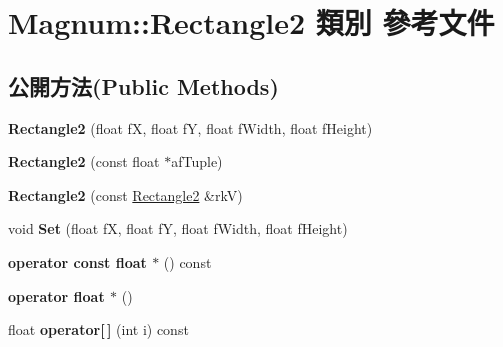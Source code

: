 \hypertarget{class_magnum_1_1_rectangle2}{}\section{Magnum\+:\+:Rectangle2 類別 參考文件}
\label{class_magnum_1_1_rectangle2}
\subsection*{公開方法(Public Methods)}
\begin{DoxyCompactItemize}
\item 
{\bfseries Rectangle2} (float fX, float fY, float f\+Width, float f\+Height)\hypertarget{class_magnum_1_1_rectangle2_a4564836390230478153dc94e8be9a3ab}{}\label{class_magnum_1_1_rectangle2_a4564836390230478153dc94e8be9a3ab}

\item 
{\bfseries Rectangle2} (const float $\ast$af\+Tuple)\hypertarget{class_magnum_1_1_rectangle2_a3f3d726bf41ba44d8831b33724f79499}{}\label{class_magnum_1_1_rectangle2_a3f3d726bf41ba44d8831b33724f79499}

\item 
{\bfseries Rectangle2} (const \hyperlink{class_magnum_1_1_rectangle2}{Rectangle2} \&rkV)\hypertarget{class_magnum_1_1_rectangle2_abb0e2d52da781a38117a179f144c57bc}{}\label{class_magnum_1_1_rectangle2_abb0e2d52da781a38117a179f144c57bc}

\item 
void {\bfseries Set} (float fX, float fY, float f\+Width, float f\+Height)\hypertarget{class_magnum_1_1_rectangle2_a30e61af101d572127834c67f116603fd}{}\label{class_magnum_1_1_rectangle2_a30e61af101d572127834c67f116603fd}

\item 
{\bfseries operator const float $\ast$} () const \hypertarget{class_magnum_1_1_rectangle2_a290f5ccc84b5e4c34ed1fd1294b2473e}{}\label{class_magnum_1_1_rectangle2_a290f5ccc84b5e4c34ed1fd1294b2473e}

\item 
{\bfseries operator float $\ast$} ()\hypertarget{class_magnum_1_1_rectangle2_a9df90aa3e93ef16b689e25f25a246e73}{}\label{class_magnum_1_1_rectangle2_a9df90aa3e93ef16b689e25f25a246e73}

\item 
float {\bfseries operator\mbox{[}$\,$\mbox{]}} (int i) const \hypertarget{class_magnum_1_1_rectangle2_ad9881719e5a8ba89257d9d47025107a4}{}\label{class_magnum_1_1_rectangle2_ad9881719e5a8ba89257d9d47025107a4}


\end{DoxyCompactItemize}
